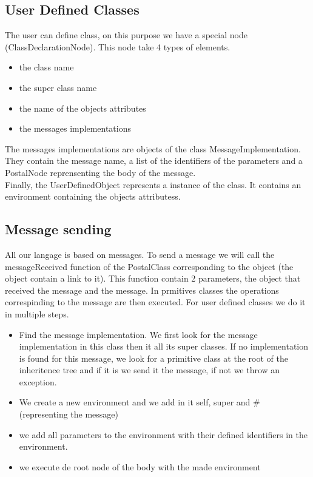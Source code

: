 \documentclass{eplDoc}
\begin{document}
\subsection{User Defined Classes}
The user can define class, on this purpose we have a special node (ClassDeclarationNode). This node take 4 types of elements.  
\begin{itemize}
	\item the class name
	\item the super class name
	\item the name of the objects attributes
	\item the messages implementations
\end{itemize}

The messages implementations are objects of the class MessageImplementation.  They contain the message name, a list of the identifiers of the parameters and a PostalNode reprensenting the body of the message.
\\
Finally, the UserDefinedObject represents a instance of the class.  It contains an environment containing the objects attributess.

\subsection{Message sending}
All our langage is based on messages.  To send a message we will call the messageReceived function of the PostalClass corresponding to the object (the object contain a link to it).  This function contain 2 parameters, the object that received the message and the message.  In prmitives classes the operations correspinding to the message are then executed.  For user defined classes we do it in multiple steps.
\begin{itemize}
	\item Find the message implementation.  We first look for the message implementation in this class then it all its super classes.  If no implementation is found for this message, we look for a primitive class at the root of the inheritence tree and if it is we send it the message, if not we throw an exception.
	\item We create a new environment and we add in it self, super and \# (representing the message)
	\item we add all parameters to the environment with their defined identifiers in the environment.
	\item we execute de root node of the body with the made environment
\end{itemize}
\end{document}
